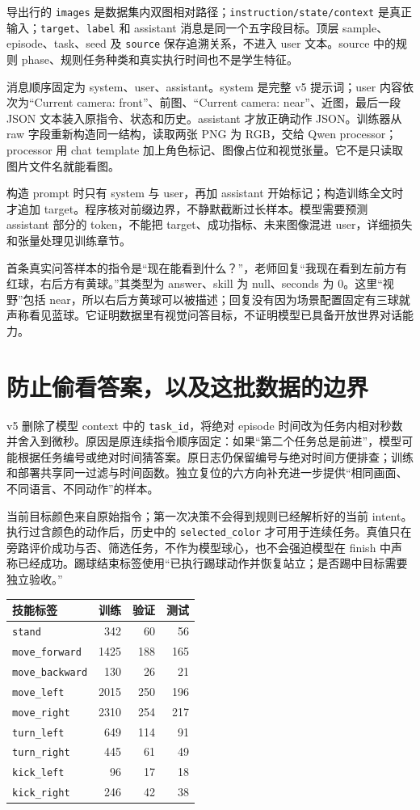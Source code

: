 导出行的 \texttt{images} 是数据集内双图相对路径；\texttt{instruction/state/context} 是真正输入；\texttt{target}、\texttt{label} 和 assistant 消息是同一个五字段目标。顶层 sample、episode、task、seed 及 \texttt{source} 保存追溯关系，不进入 user 文本。source 中的规则 phase、规则任务种类和真实执行时间也不是学生特征。

消息顺序固定为 system、user、assistant。system 是完整 v5 提示词；user 内容依次为“Current camera: front”、前图、“Current camera: near”、近图，最后一段 JSON 文本装入原指令、状态和历史。assistant 才放正确动作 JSON。训练器从 raw 字段重新构造同一结构，读取两张 PNG 为 RGB，交给 Qwen processor；processor 用 chat template 加上角色标记、图像占位和视觉张量。它不是只读取图片文件名就能看图。

构造 prompt 时只有 system 与 user，再加 assistant 开始标记；构造训练全文时才追加 target。程序核对前缀边界，不静默截断过长样本。模型需要预测 assistant 部分的 token，不能把 target、成功指标、未来图像混进 user，详细损失和张量处理见训练章节。

首条真实问答样本的指令是“现在能看到什么？”，老师回复“我现在看到左前方有红球，右后方有黄球。”其类型为 answer、skill 为 null、seconds 为 0。这里“视野”包括 near，所以右后方黄球可以被描述；回复没有因为场景配置固定有三球就声称看见蓝球。它证明数据里有视觉问答目标，不证明模型已具备开放世界对话能力。

\section{防止偷看答案，以及这批数据的边界}

v5 删除了模型 context 中的 \texttt{task\_id}，将绝对 episode 时间改为任务内相对秒数并舍入到微秒。原因是原连续指令顺序固定：如果“第二个任务总是前进”，模型可能根据任务编号或绝对时间猜答案。原日志仍保留编号与绝对时间方便排查；训练和部署共享同一过滤与时间函数。独立复位的六方向补充进一步提供“相同画面、不同语言、不同动作”的样本。

当前目标颜色来自原始指令；第一次决策不会得到规则已经解析好的当前 intent。执行过含颜色的动作后，历史中的 \texttt{selected\_color} 才可用于连续任务。真值只在旁路评价成功与否、筛选任务，不作为模型球心，也不会强迫模型在 finish 中声称已经成功。踢球结束标签使用“已执行踢球动作并恢复站立；是否踢中目标需要独立验收。”

\begin{longtable}{P{4.0cm}r r r}
\hline
技能标签 & 训练 & 验证 & 测试\\
\hline
\endhead
\texttt{stand} &342&60&56\\
\texttt{move\_forward} &1425&188&165\\
\texttt{move\_backward} &130&26&21\\
\texttt{move\_left} &2015&250&196\\
\texttt{move\_right} &2310&254&217\\
\texttt{turn\_left} &649&114&91\\
\texttt{turn\_right} &445&61&49\\
\texttt{kick\_left} &96&17&18\\
\texttt{kick\_right} &246&42&38\\
\hline
\end{longtable}

